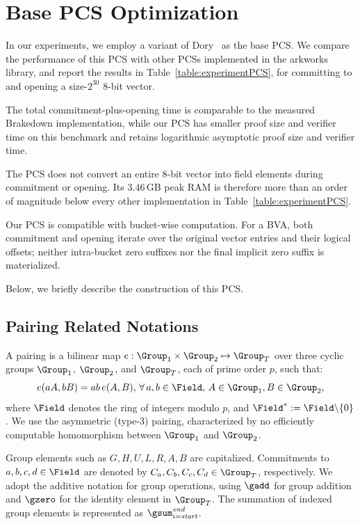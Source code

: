 
\section{Base PCS Optimization}
\label{appx:pcs}

In our experiments, we employ a variant of Dory~\cite{tcc/Lee21} as the base PCS.
We compare the performance of this PCS with other PCSs implemented in the
\textsf{arkworks} library, and report the results in
Table~\ref{table:experimentPCS}, for committing to and opening a
size-$2^{30}$ 8-bit vector.

The total commitment-plus-opening time is comparable to the measured Brakedown
implementation, while our PCS has smaller proof size and verifier time on this
benchmark and retains logarithmic asymptotic proof size and verifier time.

The PCS does not convert an entire 8-bit vector into field elements during
commitment or opening.  Its $3.46$\,GB peak RAM is therefore more than an order
of magnitude below every other implementation in
Table~\ref{table:experimentPCS}.

Our PCS is compatible with bucket-wise computation.  For a BVA, both commitment
and opening iterate over the original vector entries and their logical offsets;
neither intra-bucket zero suffixes nor the final implicit zero suffix is materialized.

Below, we briefly describe the construction of this PCS.

\subsection{Pairing Related Notations}

\label{sec:notationPairing}
A pairing is a bilinear map $e: \Group_1 \times \Group_2 \mapsto \Group_T$ over three cyclic groups $\Group_1$, $\Group_2$, and $\Group_T$, each of prime order $p$, such that:
\[
	e(aA, bB) = ab\, e(A, B), \, \forall\, a, b\in \Field, \, A \in \Group_1, B \in \Group_2,
\]
where $\Field$ denotes the ring of integers modulo $p$, and $\Field^* := \Field \backslash \{ 0 \}$.
We use the asymmetric (type-3) pairing, characterized by no efficiently computable homomorphism between $\Group_1$ and $\Group_2$.

\label{sec:notationGroupElements}
Group elements such as $G, H, U, L, R, A, B$ are capitalized.
Commitments to $a, b, c, d \in \Field$ are denoted by 
$C_a, C_b, C_c, C_d \in \Group_T$, respectively.
We adopt the additive notation for group operations, using $\gadd$ for group addition and $\gzero$ for the identity element in $\Group_T$.
The summation of indexed group elements is represented as $\gsum_{i = \mathit{start}}^{\mathit{end}}$.


